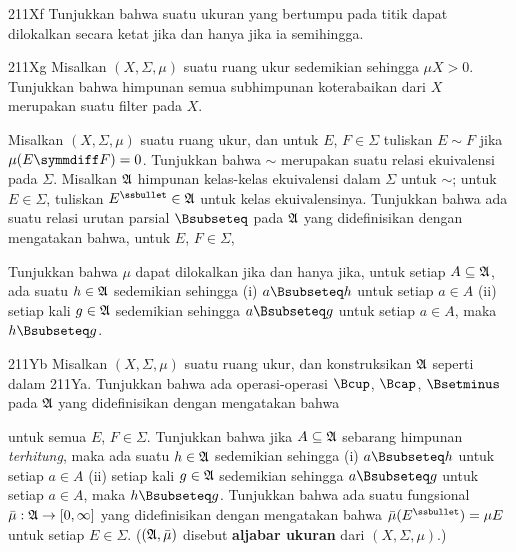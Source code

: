 {\spheader 211Xf Tunjukkan bahwa suatu ukuran yang bertumpu pada titik
dapat dilokalkan secara ketat jika dan hanya jika ia semihingga.
     
\spheader 211Xg Misalkan $(X,\Sigma,\mu)$ suatu ruang ukur sedemikian
sehingga $\mu X>0$.   Tunjukkan bahwa himpunan semua subhimpunan
koterabaikan dari $X$ merupakan suatu filter pada $X$.

Misalkan $(X,\Sigma,\mu)$ suatu ruang ukur, dan untuk
$E$, $F\in\Sigma$ tuliskan $E\sim F$ jika
$\mu(E\symmdiff F)=0$.   Tunjukkan bahwa $\sim$ merupakan suatu relasi
ekuivalensi pada $\Sigma$.   Misalkan $\frak A$ himpunan kelas-kelas
ekuivalensi dalam $\Sigma$ untuk $\sim$;  untuk $E\in\Sigma$, tuliskan
$E^{\ssbullet}\in\frak A$ untuk kelas ekuivalensinya.   Tunjukkan bahwa
ada suatu relasi urutan parsial $\Bsubseteq$ pada $\frak A$ yang
didefinisikan dengan mengatakan bahwa, untuk $E$, $F\in\Sigma$,
     
     
\noindent Tunjukkan bahwa $\mu$ dapat dilokalkan jika dan hanya jika,
untuk setiap $A\subseteq\frak A$, ada suatu $h\in\frak A$ sedemikian
sehingga (i) $a\Bsubseteq h$ untuk setiap $a\in A$ (ii) setiap kali
$g\in\frak A$ sedemikian sehingga $a\Bsubseteq g$ untuk setiap
$a\in A$, maka $h\Bsubseteq g$.
     
\spheader 211Yb Misalkan $(X,\Sigma,\mu)$ suatu ruang ukur, dan
konstruksikan $\frak A$ seperti dalam 211Ya.   Tunjukkan bahwa ada
operasi-operasi $\Bcup$, $\Bcap$, $\Bsetminus$ pada $\frak A$ yang
didefinisikan dengan mengatakan bahwa
     
     
\noindent untuk semua $E$, $F\in\Sigma$.
Tunjukkan bahwa jika $A\subseteq\frak A$ sebarang himpunan
{\it terhitung}, maka ada suatu $h\in\frak A$ sedemikian sehingga
(i) $a\Bsubseteq h$ untuk setiap $a\in A$ (ii) setiap kali
$g\in\frak A$ sedemikian sehingga $a\Bsubseteq g$ untuk setiap
$a\in A$, maka $h\Bsubseteq g$.   Tunjukkan bahwa ada suatu
fungsional $\bar\mu:\frak A\to[0,\infty]$ yang didefinisikan dengan
mengatakan bahwa $\bar\mu(E^{\ssbullet})=\mu E$ untuk setiap
$E\in\Sigma$.
($(\frak A,\bar\mu)$ disebut {\bf aljabar ukuran} dari
$(X,\Sigma,\mu)$.)
     
}
